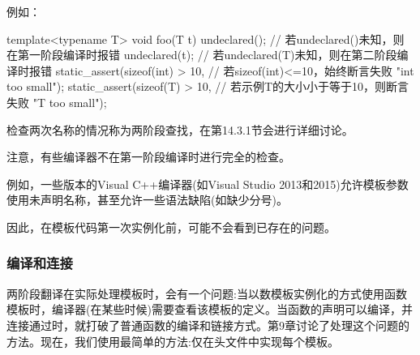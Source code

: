 例如：

\begin{cpp}
template<typename T>
void foo(T t)
{
	undeclared(); // 若undeclared()未知，则在第一阶段编译时报错
	undeclared(t); // 若undeclared(T)未知，则在第二阶段编译时报错
	static_assert(sizeof(int) > 10, // 若sizeof(int)<=10，始终断言失败
				  "int too small");
	static_assert(sizeof(T) > 10, // 若示例T的大小小于等于10，则断言失败
	              "T too small");
}
\end{cpp}

检查两次名称的情况称为两阶段查找，在第14.3.1节会进行详细讨论。

注意，有些编译器不在第一阶段编译时进行完全的检查。

\begin{notice}
例如，一些版本的Visual C++编译器(如Visual Studio 2013和2015)允许模板参数使用未声明名称，甚至允许一些语法缺陷(如缺少分号)。
\end{notice}

因此，在模板代码第一次实例化前，可能不会看到已存在的问题。

\subsubsection{编译和连接}

两阶段翻译在实际处理模板时，会有一个问题:当以数模板实例化的方式使用函数模板时，编译器(在某些时候)需要查看该模板的定义。当函数的声明可以编译，并连接通过时，就打破了普通函数的编译和链接方式。第9章讨论了处理这个问题的方法。现在，我们使用最简单的方法:仅在头文件中实现每个模板。








